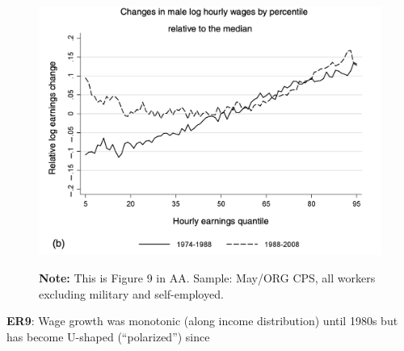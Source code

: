 \documentclass[11pt, aspectratio=169]{beamer}
\begin{document}
\begin{frame}{}
	\vspace{4mm}
	\begin{figure}
		\includegraphics[scale=0.32]{./figures/inequality_polarization_1}
	\vspace*{-2mm}
	\begin{flushleft}
		{\scriptsize \hspace{6mm} \textbf{Note:} This is Figure 9 in AA. Sample: May/ORG CPS, all workers excluding military and self-employed.}
	\end{flushleft}	
	\end{figure}

	\vspace{-2mm}
	{\color{blue}\textbf{ER9}}: Wage growth was monotonic (along income distribution) until 1980s but has become U-shaped (``polarized'') since 
\end{frame}
\end{document}

